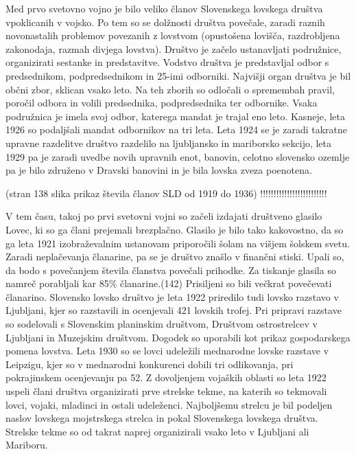 \documentclass[a4paper,12pt,openright]{book}
\begin{document}
Med prvo svetovno vojno je bilo veliko članov Slovenskega lovskega društva vpoklicanih v vojsko. 
Po tem so se dolžnosti društva povečale, zaradi raznih novonastalih problemov povezanih z lovstvom (opustošena lovišča, razdrobljena zakonodaja, razmah divjega lovstva). 
Društvo je začelo ustanavljati podružnice, organizirati sestanke in predstavitve. 
Vodstvo društva je predstavljal odbor s predsednikom, podpredsednikom in 25-imi odborniki. 
Najvišji organ društva je bil občni zbor, sklican vsako leto. Na teh zborih so odločali o spremembah pravil, poročil odbora in volili predsednika, podpredsednika ter odbornike. Vsaka podružnica je imela svoj odbor, katerega mandat je trajal eno leto. 
Kasneje, leta 1926 so podaljšali mandat odbornikov na tri leta. 
Leta 1924 se je zaradi takratne upravne razdelitve društvo razdelilo na ljubljansko in mariborsko sekcijo, leta 1929 pa je zaradi uvedbe novih upravnih enot, banovin, celotno slovensko ozemlje pa je bilo združeno v Dravski banovini in je bila lovska zveza poenotena. \cite{Lov_129_149}

(stran 138 slika prikaz števila članov SLD od 1919 do 1936) !!!!!!!!!!!!!!!!!!!!!!!!! 

V tem času, takoj po prvi svetovni vojni so začeli izdajati društveno glasilo Lovec, ki so ga člani prejemali brezplačno. 
Glasilo je bilo tako kakovostno, da so ga leta 1921 izobraževalnim ustanovam priporočili šolam na višjem šolskem svetu. 
Zaradi neplačevanja članarine, pa se je društvo znašlo v finančni stiski. 
Upali so, da bodo s povečanjem števila članstva povečali prihodke. Za tiskanje glasila so namreč porabljali kar 85\% članarine.(142) 
Prisiljeni so bili večkrat povečevati članarino.
Slovensko lovsko društvo je leta 1922 priredilo tudi lovsko razstavo v Ljubljani, kjer so razstavili in ocenjevali 421 lovskih trofej. 
Pri pripravi razstave so sodelovali s Slovenskim planinskim društvom, Društvom ostrostrelcev v Ljubljani in Muzejskim društvom. 
Dogodek so uporabili kot prikaz gospodarskega pomena lovstva. 
Leta 1930 so se lovci udeležili mednarodne lovske razstave v Leipzigu, kjer so v mednarodni konkurenci dobili tri odlikovanja, pri pokrajinskem ocenjevanju pa 52. 
Z dovoljenjem vojaških oblasti so leta 1922 uspeli člani društva organizirati prve strelske tekme, na katerih so tekmovali lovci, vojaki, mladinci in ostali udeleženci. Najboljšemu strelcu je bil podeljen naslov lovskega mojstrskega strelca in pokal Slovenskega lovskega društva. 
Strelske tekme so od takrat naprej organizirali vsako leto v Ljubljani ali Mariboru.\cite{Lov_129_149}
\end{document}
